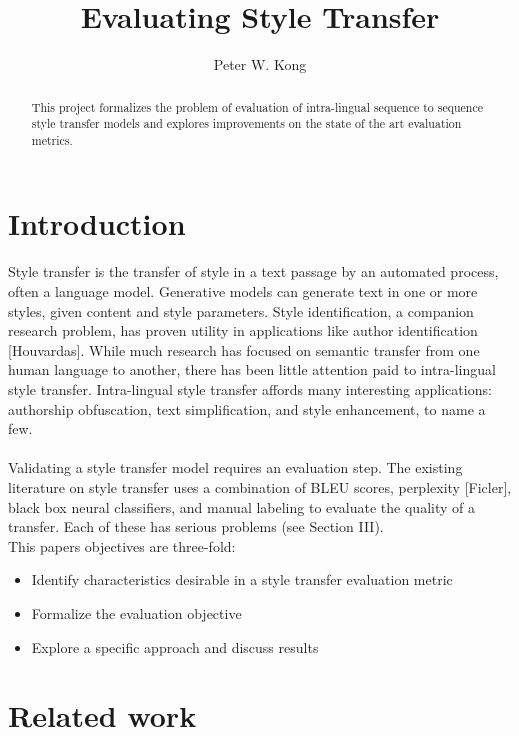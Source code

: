 \documentclass[letterpaper, 10 pt, conference]{ieeeconf}  %
\title{\LARGE \bf
Evaluating Style Transfer
}
\author{Peter W. Kong}
\begin{document}
\maketitle
\thispagestyle{empty}
\pagestyle{empty}

\begin{abstract}

This project formalizes the problem of evaluation of intra-lingual sequence to sequence style transfer models and explores improvements on the state of the art evaluation metrics.

\end{abstract}

\section{Introduction}
Style transfer is the transfer of style in a text passage by an automated process, often a language model. Generative models can generate text in one or more styles, given content and style parameters. Style identification, a companion research problem, has proven utility in applications like author identification [Houvardas]. While much research has focused on semantic transfer from one human language to another, there has been little attention paid to intra-lingual style transfer. Intra-lingual style transfer affords many interesting applications: authorship obfuscation, text simplification, and style enhancement, to name a few.
\\
\\
Validating a style transfer model requires an evaluation step. The existing literature on style transfer uses a combination of BLEU scores, perplexity [Ficler], black box neural classifiers, and manual labeling to evaluate the quality of a transfer. Each of these has serious problems (see Section III).
\\

This paper\textquotesingle s objectives are three-fold:
\begin{itemize}
    \item Identify characteristics desirable in a style transfer evaluation metric
    \item Formalize the evaluation objective
    \item Explore a specific approach and discuss results
\end{itemize} 
\section{Related work}
\end{document}
